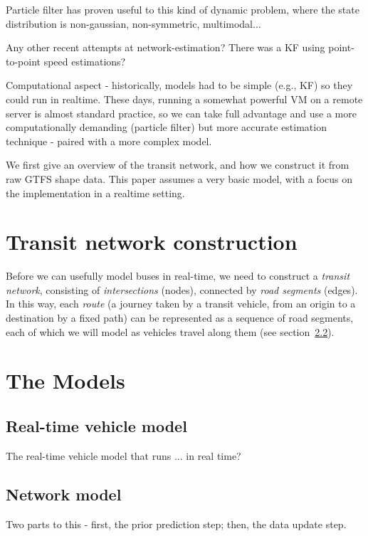 \documentclass[times, doublespace]{anzsauth}
\begin{document}
Particle filter has proven useful to this kind of dynamic problem,
where the state distribution is non-gaussian, non-symmetric, 
multimodal...

Any other recent attempts at network-estimation?
There was a KF using point-to-point speed estimations? 

Computational aspect - historically, models had to be simple 
(e.g., KF) so they could run in realtime.
These days, running a somewhat powerful VM on a remote server
is almost standard practice, so we can take full advantage 
and use a more computationally demanding (particle filter)
but more accurate estimation technique - paired with a more complex model.

We first give an overview of the transit network,
and how we construct it from raw GTFS shape data.
This paper assumes a very basic model,
with a focus on the implementation in a realtime setting.




\section{Transit network construction}
\label{sec:gtfs}

Before we can usefully model buses in real-time, 
we need to construct a \emph{transit network}, 
consisting of \emph{intersections} (nodes),
connected by \emph{road segments} (edges).
In this way, each \emph{route} 
(a journey taken by a transit vehicle, from an origin to a destination by a fixed path)
can be represented as a sequence of road segments,
each of which we will model as vehicles travel along them (see section~\ref{sec:kf}).


\section{The Models}
\label{sec:models}

\subsection{Real-time vehicle model}
\label{sec:pf}

The real-time vehicle model that runs ... in real time?


\subsection{Network model}
\label{sec:kf}

Two parts to this - first, the prior prediction step; then, the data update step.
\end{document}

